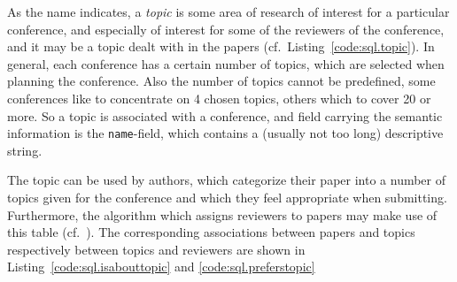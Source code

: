 %

%

%
As the name indicates, a \emph{topic} is some area of research of interest for
a particular conference, and especially of interest for some of the reviewers
of the conference, and it may be a topic dealt with in the papers (cf.\ 
Listing~\ref{code:sql.topic}). In general, each conference has a certain
number of topics, which are selected when planning the conference.  Also the
number of topics cannot be predefined, some conferences like to concentrate on
4 chosen topics, others which to cover 20 or more. So a topic is associated
with a conference, and field carrying the semantic information is the
\texttt{name}-field, which contains a (usually not too long) descriptive
string. 

%


The topic can be used by authors, which categorize their paper into a number
of topics given for the conference and which they feel appropriate when
submitting.  Furthermore, the algorithm which assigns reviewers to papers may
make use of this table (cf.\ \cite{coma:requirements}). The corresponding
associations between papers and topics respectively between topics and
reviewers are shown in Listing~\ref{code:sql.isabouttopic} and
\ref{code:sql.preferstopic}
%
%





%

%




\medskip

